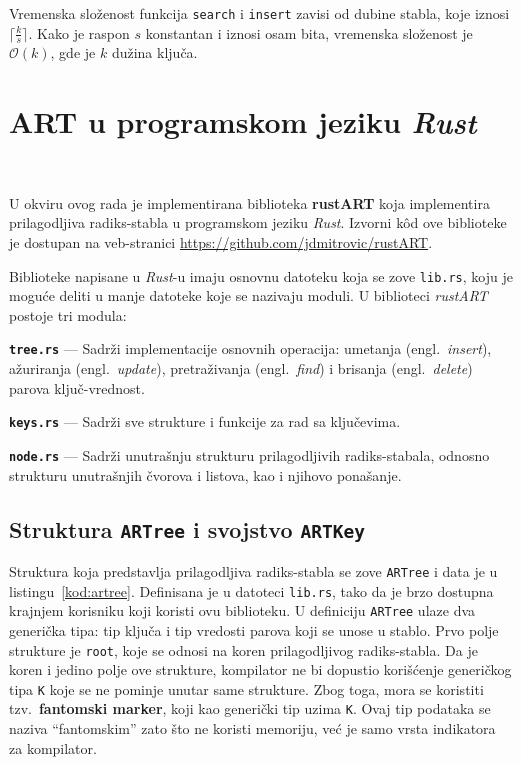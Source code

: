 \documentclass[12pt,oneside]{memoir}
\begin{document}
Vremenska složenost funkcija \texttt{search} i \texttt{insert}
zavisi od dubine stabla, koje iznosi
$ \lceil \frac{k}{s} \rceil $. Kako je raspon $s$ konstantan i
iznosi osam bita, vremenska složenost je
$ \mathcal{O}(k) $, gde je $k$ dužina ključa.

\chapter{ART u programskom jeziku \textit{Rust}}~\label{ch:rustART}

U okviru ovog rada je implementirana biblioteka \textbf{rustART}
koja implementira prilagodljiva radiks-stabla u programskom
jeziku \textit{Rust}. Izvorni kôd ove biblioteke je dostupan na
veb-stranici \url{https://github.com/jdmitrovic/rustART}.

Biblioteke napisane u \textit{Rust}-u
imaju osnovnu datoteku koja se zove \texttt{lib.rs},
koju je moguće deliti u manje datoteke koje se nazivaju
moduli. U biblioteci \textit{rustART} postoje
tri modula:

\begin{description}
  \item{\textbf{\texttt{tree.rs}}} --- Sadrži implementacije osnovnih operacija:
        umetanja (engl.\ \textit{insert}), ažuriranja (engl.\ \textit{update}),
        pretraživanja (engl.\ \textit{find}) i brisanja (engl.\ \textit{delete})
        parova ključ-vrednost.

  \item{\textbf{\texttt{keys.rs}}} --- Sadrži sve strukture i funkcije za rad sa ključevima.

  \item{\textbf{\texttt{node.rs}}} --- Sadrži unutrašnju strukturu prilagodljivih
        radiks-stabala, odnosno strukturu unutrašnjih čvorova i listova,
        kao i njihovo ponašanje.
\end{description}


\section{Struktura \texttt{ARTree} i svojstvo \texttt{ARTKey}}

Struktura koja predstavlja prilagodljiva radiks-stabla se zove \texttt{ARTree}
i data je u listingu~\ref{kod:artree}. Definisana je u datoteci \texttt{lib.rs},
tako da je brzo dostupna krajnjem korisniku koji koristi ovu biblioteku.
U definiciju \texttt{ARTree} ulaze dva generička tipa: tip ključa i tip vredosti
parova koji se unose u stablo. Prvo polje strukture je \texttt{root}, koje se odnosi
na koren prilagodljivog radiks-stabla. Da je koren i jedino polje ove strukture,
kompilator ne bi dopustio korišćenje generičkog tipa \texttt{K} koje se ne pominje
unutar same strukture. Zbog toga, mora se koristiti tzv.\ \textbf{fantomski marker},
koji kao generički tip uzima \texttt{K}. Ovaj tip podataka se naziva ``fantomskim''
zato što ne koristi memoriju, već je samo vrsta indikatora za kompilator.
\end{document}
